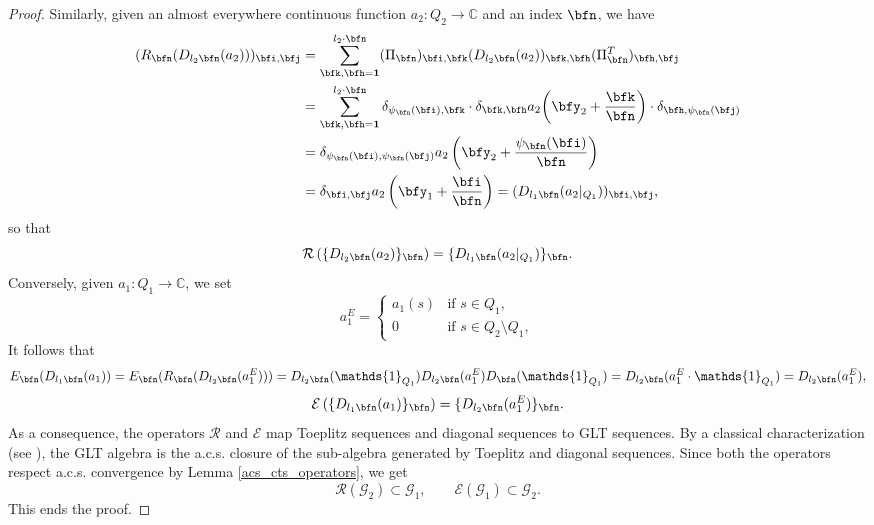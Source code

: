 \documentclass{amsart}
\begin{document}
\begin{proof}
	Similarly, given an almost everywhere continuous function $a_2:Q_2\to\mathbb{C}$ and an index $\bfn$, we have 
	\begin{align*}
		(R_{\bfn}(D_{l_2\bfn}(a_2)))_{\bfi,\bfj}&=\sum_{\bfk,\bfh=\bf1}^{l_2\cdot\bfn}(\Pi_{\bfn})_{\bfi,\bfk}(D_{l_2\bfn}(a_2))_{\bfk,\bfh}(\Pi_{\bfn}^T)_{\bfh,\bfj}\\
        &=\sum_{\bfk,\bfh=\bf1}^{l_2\cdot\bfn}\delta_{\psi_{\bfn}(\bfi),\bfk}\cdot \delta_{\bfk,\bfh}a_2\bigg(\bfy_2+\frac{\bfk}{\bfn}\bigg)\cdot\delta_{\bfh,\psi_{\bfn}(\bfj)}\\
		&=\delta_{\psi_{\bfn}(\bfi),\psi_{\bfn}(\bfj)}a_2\left(\bfy_2+\frac{\psi_{\bfn}(\bfi)}{\bfn}\right)\\
        &=\delta_{\bfi,\bfj}a_2\left(\bfy_1+\frac{\bfi}{\bfn}\right)=(D_{l_1\bfn}(a_2|_{Q_1}))_{\bfi,\bfj},
	\end{align*}
	so that
	\begin{equation*}
		\mathcal{R}\left(\{D_{l_2\bfn}(a_2)\}_{\bfn}\right)=\{D_{l_1\bfn}(a_2|_{Q_1})\}_{\bfn}.
	\end{equation*}
	Conversely, given $a_1:Q_1\to\mathbb{C}$, we set 
	\begin{equation*}
			a_1^E= \begin{cases}
				a_1(s) & \text{if } s \in Q_1, \\
				0 & \text{if } s \in Q_2\setminus Q_1,
			\end{cases}
	\end{equation*}
	It follows that 
	\begin{equation*}
		E_{\bfn}(D_{l_1\bfn}(a_1))=E_{\bfn}(R_{\bfn}(D_{l_2\bfn}(a_1^E)))=D_{l_2\bfn}(\mathds{1}_{Q_1})D_{l_2\bfn}(a_1^E)D_{\bfn}(\mathds{1}_{Q_1})=D_{l_2\bfn}(a_1^E\cdot\mathds{1}_{Q_1})=D_{l_2\bfn}(a_1^E),
	\end{equation*}
	\begin{equation*}
		\mathcal{E}\left(\{D_{l_1\bfn}(a_1)\}_{\bfn}\right)=\{D_{l_2\bfn}(a_1^E)\}_{\bfn}.
	\end{equation*}
	As a consequence, the operators $\mathcal{R}$ and $\mathcal{E}$ map Toeplitz sequences and diagonal sequences to GLT sequences. By a classical characterization (see \cite[Theorem 8.6]{glt-book-1}), the GLT algebra is the a.c.s. closure of the sub-algebra generated by Toeplitz and diagonal sequences. Since both the operators respect a.c.s. convergence by Lemma \ref{acs_cts_operators}, we get
	\begin{equation*}
		\mathcal{R}(\mathcal{G}_2)\subset\mathcal{G}_1, \qquad \mathcal{E}(\mathcal{G}_1)\subset\mathcal{G}_2.
	\end{equation*}
	This ends the proof.
\end{proof}
\end{document}
